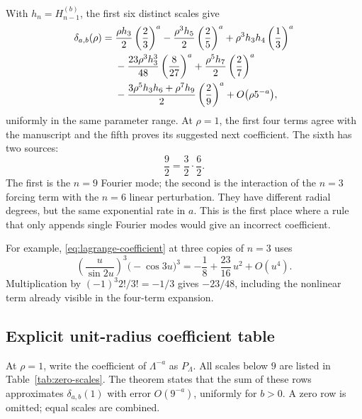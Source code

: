 \documentclass[11pt]{article}
\numberwithin{equation}{section}
\theoremstyle{plain}
\theoremstyle{definition}
\theoremstyle{remark}
\begin{document}
With $h_n=H_{n-1}^{(b)}$, the first six distinct scales give
\begin{align}\label{eq:six-scale}
 \delta_{a,b}(\rho)
 ={}&\frac{\rho h_3}{2}\left(\frac23\right)^a
 -\frac{\rho^3h_5}{2}\left(\frac25\right)^a
 +\rho^3h_3h_4\left(\frac13\right)^a\notag\\
 &-\frac{23\rho^3h_3^3}{48}\left(\frac8{27}\right)^a
 +\frac{\rho^5h_7}{2}\left(\frac27\right)^a\notag\\
 &-\frac{3\rho^5h_3h_6+\rho^7h_9}{2}
       \left(\frac29\right)^a
 +O\bigl(\rho5^{-a}\bigr),
\end{align}
uniformly in the same parameter range. At $\rho=1$, the first four
terms agree with the manuscript and the fifth proves its suggested
next coefficient. The sixth has two sources:
\[
 \frac92=\frac32\cdot\frac62.
\]
The first is the $n=9$ Fourier mode; the second is the interaction
of the $n=3$ forcing term with the $n=6$ linear perturbation. They have
different radial degrees, but the same exponential rate in $a$.
This is the first place where a rule that only appends single Fourier
modes would give an incorrect coefficient.

For example, \eqref{eq:lagrange-coefficient} at three copies of $n=3$
uses
\[
 \left(\frac u{\sin2u}\right)^3\bigl(-\cos3u\bigr)^3
 =-\frac18+\frac{23}{16}\,u^2+O(u^4).
\]
Multiplication by $(-1)^3 2!/3!=-1/3$ gives $-23/48$, including
the nonlinear term already visible in the four-term expansion.

\subsection{Explicit unit-radius coefficient table}

At $\rho=1$, write the coefficient of $\Lambda^{-a}$ as $P_\Lambda$.
All scales below $9$ are listed in Table~\ref{tab:zero-scales}. The theorem states that the sum
of these rows approximates $\delta_{a,b}(1)$ with error $O(9^{-a})$,
uniformly for $b>0$. A zero row is omitted; equal scales are combined.
\end{document}
